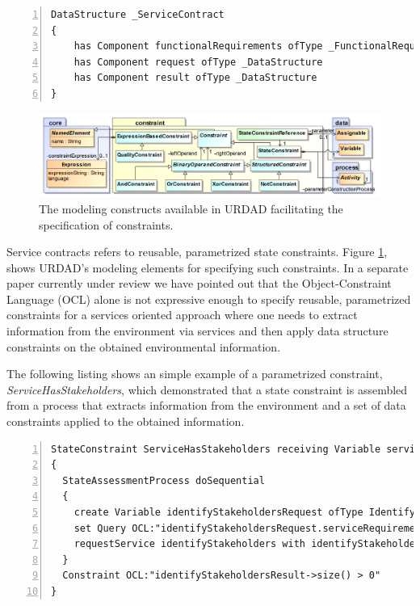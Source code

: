 \lstset{language=urdad,caption=Regenerated metamodel classes.,label=constraintTextSyntax}
\begin{lstlisting}[numbers=left,escapechar=|]
DataStructure _ServiceContract 
{
    has Component functionalRequirements ofType _FunctionalRequirements
    has Component request ofType _DataStructure
    has Component result ofType _DataStructure
}
\end{lstlisting}

\begin{figure}[Htbp]
  \centering
  \includegraphics{constraint}
  \caption{The modeling constructs available in URDAD facilitating the specification of constraints.}
  \label{fig:constraintModule}
\end{figure}

Service contracts refers to reusable, parametrized state constraints. Figure \ref{fig:constraintModule}, shows URDAD's modeling elements for specifying such constraints. In a separate paper currently under review we have pointed out that the Object-Constraint Language (OCL)\cite{_object_2010}  alone is not expressive enough to specify reusable, parametrized constraints for a services oriented approach where one needs to extract information from the environment via services and then apply data structure constraints on the obtained environmental information.

The following listing shows an simple example of a parametrized constraint, \emph{ServiceHasStakeholders}, which demonstrated that a state constraint is assembled from a process that extracts information from the environment and a set of data constraints applied to the obtained information.
\lstset{language=urdad,caption=Specifying a state constraint in the URDAD text grammar.,label=processTextSyntax}
\begin{lstlisting}[numbers=left,escapechar=|]
StateConstraint ServiceHasStakeholders receiving Variable serviceRequirements ofType _ServiceRequirements 
{
  StateAssessmentProcess doSequential 
  {
    create Variable identifyStakeholdersRequest ofType IdentifyStakeholdersRequest
    set Query OCL:"identifyStakeholdersRequest.serviceRequirements" equalTo Query OCL:"serviceRequirements"
    requestService identifyStakeholders with identifyStakeholdersRequest yielding Variable identifyStakeholdersResult ofType IdentifyStakeholdersResult
  }
  Constraint OCL:"identifyStakeholdersResult->size() > 0"
}
\end{lstlisting}

